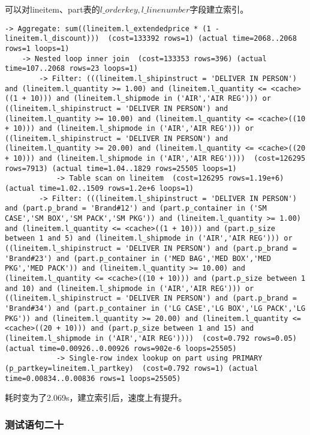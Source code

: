 \documentclass{article}
\begin{document}
可以对lineitem、part表的$l\_orderkey,l\_linenumber$字段建立索引。

\begin{lstlisting}
-> Aggregate: sum((lineitem.l_extendedprice * (1 - lineitem.l_discount)))  (cost=133392 rows=1) (actual time=2068..2068 rows=1 loops=1)
    -> Nested loop inner join  (cost=133353 rows=396) (actual time=107..2068 rows=23 loops=1)
        -> Filter: (((lineitem.l_shipinstruct = 'DELIVER IN PERSON') and (lineitem.l_quantity >= 1.00) and (lineitem.l_quantity <= <cache>((1 + 10))) and (lineitem.l_shipmode in ('AIR','AIR REG'))) or ((lineitem.l_shipinstruct = 'DELIVER IN PERSON') and (lineitem.l_quantity >= 10.00) and (lineitem.l_quantity <= <cache>((10 + 10))) and (lineitem.l_shipmode in ('AIR','AIR REG'))) or ((lineitem.l_shipinstruct = 'DELIVER IN PERSON') and (lineitem.l_quantity >= 20.00) and (lineitem.l_quantity <= <cache>((20 + 10))) and (lineitem.l_shipmode in ('AIR','AIR REG'))))  (cost=126295 rows=7913) (actual time=1.04..1829 rows=25505 loops=1)
            -> Table scan on lineitem  (cost=126295 rows=1.19e+6) (actual time=1.02..1509 rows=1.2e+6 loops=1)
        -> Filter: (((lineitem.l_shipinstruct = 'DELIVER IN PERSON') and (part.p_brand = 'Brand#12') and (part.p_container in ('SM CASE','SM BOX','SM PACK','SM PKG')) and (lineitem.l_quantity >= 1.00) and (lineitem.l_quantity <= <cache>((1 + 10))) and (part.p_size between 1 and 5) and (lineitem.l_shipmode in ('AIR','AIR REG'))) or ((lineitem.l_shipinstruct = 'DELIVER IN PERSON') and (part.p_brand = 'Brand#23') and (part.p_container in ('MED BAG','MED BOX','MED PKG','MED PACK')) and (lineitem.l_quantity >= 10.00) and (lineitem.l_quantity <= <cache>((10 + 10))) and (part.p_size between 1 and 10) and (lineitem.l_shipmode in ('AIR','AIR REG'))) or ((lineitem.l_shipinstruct = 'DELIVER IN PERSON') and (part.p_brand = 'Brand#34') and (part.p_container in ('LG CASE','LG BOX','LG PACK','LG PKG')) and (lineitem.l_quantity >= 20.00) and (lineitem.l_quantity <= <cache>((20 + 10))) and (part.p_size between 1 and 15) and (lineitem.l_shipmode in ('AIR','AIR REG'))))  (cost=0.792 rows=0.05) (actual time=0.00926..0.00926 rows=902e-6 loops=25505)
            -> Single-row index lookup on part using PRIMARY (p_partkey=lineitem.l_partkey)  (cost=0.792 rows=1) (actual time=0.00834..0.00836 rows=1 loops=25505)
\end{lstlisting}

耗时变为了2.069s，建立索引后，速度上有提升。

\subsubsection{测试语句二十}
\end{document}

